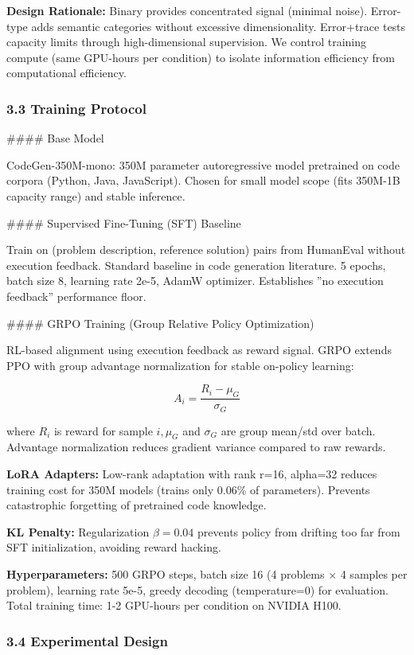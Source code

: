 \textbf{Design Rationale:} Binary provides concentrated signal (minimal noise). Error-type adds semantic categories without excessive dimensionality. Error+trace tests capacity limits through high-dimensional supervision. We control training compute (same GPU-hours per condition) to isolate information efficiency from computational efficiency.

\subsubsection{3.3 Training Protocol}

\#\#\#\# Base Model

CodeGen-350M-mono: 350M parameter autoregressive model pretrained on code corpora (Python, Java, JavaScript). Chosen for small model scope (fits 350M-1B capacity range) and stable inference.

\#\#\#\# Supervised Fine-Tuning (SFT) Baseline

Train on (problem description, reference solution) pairs from HumanEval without execution feedback. Standard baseline in code generation literature. 5 epochs, batch size 8, learning rate 2e-5, AdamW optimizer. Establishes ''no execution feedback'' performance floor.

\#\#\#\# GRPO Training (Group Relative Policy Optimization)

RL-based alignment using execution feedback as reward signal. GRPO extends PPO with group advantage normalization for stable on-policy learning:

$$A_i = \frac{R_i - \mu_G}{\sigma_G}$$

where $R_i$ is reward for sample $i, \mu_G$ and $\sigma_G$ are group mean/std over batch. Advantage normalization reduces gradient variance compared to raw rewards.

\textbf{LoRA Adapters:} Low-rank adaptation with rank r=16, alpha=32 reduces training cost for 350M models (trains only 0.06\% of parameters). Prevents catastrophic forgetting of pretrained code knowledge.

\textbf{KL Penalty:} Regularization $\beta =0.04$ prevents policy from drifting too far from SFT initialization, avoiding reward hacking.

\textbf{Hyperparameters:} 500 GRPO steps, batch size 16 (4 problems $\times$ 4 samples per problem), learning rate 5e-5, greedy decoding (temperature=0) for evaluation. Total training time: 1-2 GPU-hours per condition on NVIDIA H100.

\subsubsection{3.4 Experimental Design}

